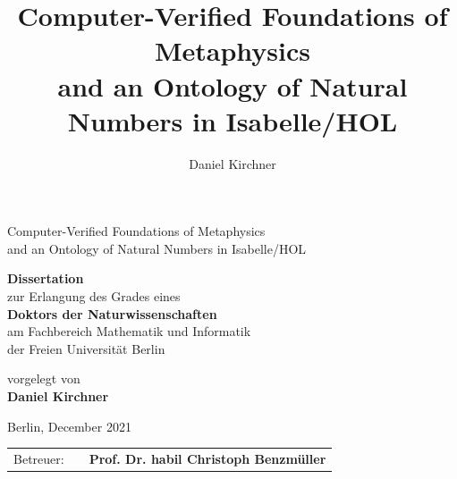 \documentclass[a4paper,enabledeprecatedfontcommands,abstract=on,twoside=true]{scrreprt}
\title{Computer-Verified Foundations of Metaphysics\\ and an Ontology of Natural Numbers in Isabelle/HOL}
\author{Daniel Kirchner}
\numberwithin{TODO}{chapter}
\numberwithin{equation}{section}
\begin{document}
\begin{titlepage}
\vspace{1cm}

    \vspace*{\fill}
\begin{center}
    \LARGE{\textsf{Computer-Verified Foundations of Metaphysics\\ and an Ontology of Natural Numbers in Isabelle/HOL}}

    \vspace{3cm}
    
\large{\textbf{Dissertation}}\\
zur Erlangung des Grades eines\\
\textbf{Doktors der Naturwissenschaften}\\
    \vspace{0.5cm}
am Fachbereich Mathematik und Informatik\\
der Freien Universität Berlin

    \vspace{3cm}

    \small{vorgelegt von}\\
    \vspace{0.25cm}
    \large{\textbf{Daniel Kirchner}}

    \vspace{3cm}
    \large{Berlin, December 2021}
\end{center}
    \vspace*{\fill}
\end{titlepage}


\cleardoublepage

\pagestyle{empty}

    \vspace*{\fill}
\begin{tabular}{lll}
Betreuer: & & \textbf{Prof. Dr. habil Christoph Benzm\"uller}
\end{tabular}
    \vspace*{\fill}


\cleardoublepage
\pagestyle{plain}
\end{document}
